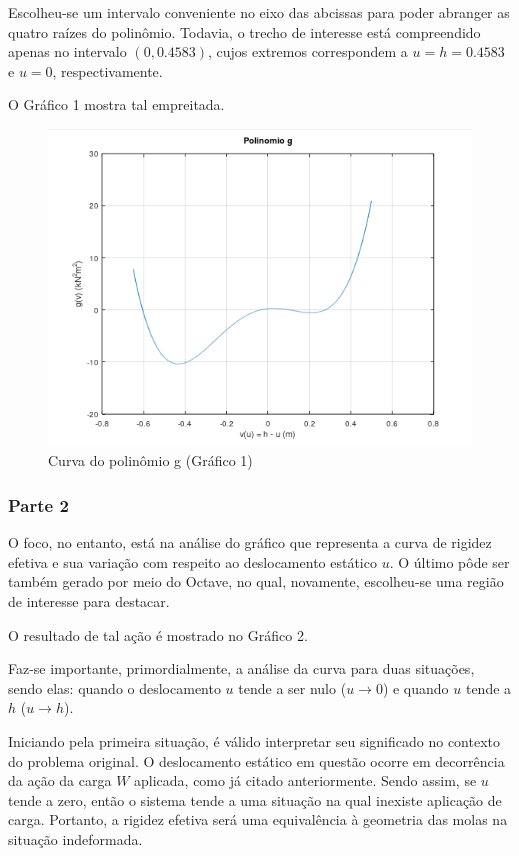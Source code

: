 \documentclass[a4paper, 12pt]{article}
\begin{document}
	Escolheu-se um intervalo 
	conveniente no eixo das abcissas para poder abranger as quatro raízes do polinômio. Todavia, o trecho de interesse
	está compreendido apenas no intervalo $(0,0.4583)$, cujos extremos correspondem a $u=h=0.4583$ e $u=0$, respectivamente.
	
	O Gráfico 1 mostra tal empreitada.
	
	\begin{figure}[H]
		\centering
		\includegraphics[scale=1]{g1.png}
		\caption{Curva do polinômio g (Gráfico 1)}
	\end{figure}
	
	\subsubsection{Parte 2}
	
	O foco, no entanto, está na análise do gráfico que representa a curva de rigidez efetiva e sua variação com respeito 
	ao deslocamento	estático $u$. O último pôde ser também gerado por meio do Octave, no qual, novamente, escolheu-se uma 
	região de interesse	para destacar.
	
	O resultado de tal ação é mostrado no Gráfico 2.
	
	Faz-se importante, primordialmente, a análise da curva para duas situações, sendo elas: quando o deslocamento $u$ tende
	a ser nulo ($u\rightarrow 0$) e quando $u$ tende a $h$ ($u\rightarrow h$).
	
	Iniciando pela primeira situação, é válido interpretar seu significado no contexto do problema original. O deslocamento
	estático em questão ocorre em decorrência da ação da carga $W$ aplicada, como já citado anteriormente.  Sendo assim, se
	$u$ tende a zero, então o sistema tende a uma situação na qual inexiste aplicação de carga. Portanto, a rigidez efetiva
	será uma equivalência à geometria das molas na situação indeformada. 
	
\end{document}
